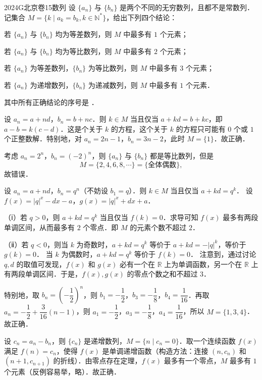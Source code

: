 
\begin{problem}{2024}{G}{北京卷}{15}{数列}
设 $\{a_n\}$ 与 $\{b_n\}$ 是两个不同的无穷数列，且都不是常数列．记集合 $M=\{k\mid a_k=b_k,k\in\mathbb{N}^*\}$，给出下列四个结论：

 若 $\{a_n\}$ 与 $\{b_n\}$ 均为等差数列，则 $M$ 中最多有 $1$ 个元素；

若 $\{a_n\}$ 与 $\{b_n\}$ 均为等比数列，则 $M$ 中最多有 $2$ 个元素；

 若 $\{a_n\}$ 为等差数列，$\{b_n\}$ 为等比数列，则 $M$ 中最多有 $3$ 个元素；

 若 $\{a_n\}$ 为递增数列，$\{b_n\}$ 为递减数列，则 $M$ 中最多有 $1$ 个元素．

其中所有正确结论的序号是 \underline{\hspace{4em}}．
\end{problem}

\begin{answer}
\end{answer}

\begin{solutions}
 设 $a_n=a+nd$，$b_n=b+nc$．则 $k\in M$ 当且仅当 $a+kd=b+kc$，即 $a-b=k(c-d)$．这是个关于 $k$ 的方程，这个关于 $k$ 的方程只可能有 $0$ 个或 $1$ 个正整数解．特别地，对 $a_n=2n-1$，$b_n=3n-2$，此时 $M=\{1\}$．故正确．

 考虑 $a_n=2^n$，$b_n=(-2)^n$，则 $\{a_n\}$ 与 $\{b_n\}$ 都是等比数列，但是
$$
M=\{2,4,6,8,\cdots\}=\{\text{全体偶数}\},
$$
故错误．

设 $a_n=a+nd$，$b_n=q^n$（不妨设 $b_1=q$）．则 $k\in M$ 当且仅当 $a+kd=q^k$．  
设 $f(x)=|q|^x-dx-a$，$g(x)=|q|^x+dx+a$．  

（ⅰ）若 $q>0$，则 $a+kd=q^k$ 当且仅当 $f(k)=0$．求导可知 $f(x)$ 最多有两段单调区间，从而最多有 $2$ 个零点．即 $M$ 的元素个数不超过 $2$．  

（ⅱ）若 $q<0$，则当 $k$ 为奇数时，$a+kd=q^k$ 等价于 $a+kd=-|q|^k$，等价于 $g(k)=0$．  
当 $k$ 为偶数时，$a+kd=q^k$ 等价于 $f(k)=0$．  
注意到，通过讨论 $q,d$ 的取值可发现，$f(x)$ 和 $g(x)$ 必有一个在 $\mathbb{R}$ 上为单调函数，另一个在 $\mathbb{R}$ 上有两段单调区间．于是，$f(x),g(x)$ 的零点个数之和不超过 $3$．  

特别地，取 $b_n=\left(-\dfrac{1}{2}\right)^n$，则 $b_1=-\dfrac{1}{2}$，$b_3=-\dfrac{1}{8}$，$b_4=\dfrac{1}{16}$．再取 $a_n=-\dfrac{1}{2}+\dfrac{3}{16}(n-1)$，则 $a_1=-\dfrac{1}{2}$，$a_3=-\dfrac{1}{8}$，$a_4=\dfrac{1}{16}$，所以 $M=\{1,3,4\}$．故正确．

 设 $c_n=a_n-b_n$，则 $\{c_n\}$ 是递增数列，$M=\{n\mid c_n=0\}$．取一个连续函数 $f(x)$ 满足 $f(n)=c_n$，使得 $f(x)$ 是单调递增函数（构造方法：连接 $(n,c_n)$ 和 $(n+1,c_{n+1})$ 的折线）．由零点存在定理，$f(x)$ 最多有一个零点，$M$ 最多有 $1$ 个元素（反例容易举，略）．故正确．
\end{solutions}

